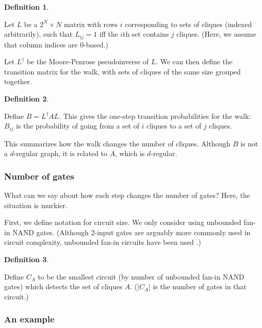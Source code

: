 \documentclass[12pt]{article}
\theoremstyle{definition}
\newtheorem{defn}{Definition}[section]
\begin{document}
\begin{defn} \label{defn:levels}

Let $L$ be a $2^N{\times}N$ matrix with rows $i$ corresponding to sets of cliques (indexed arbitrarily), such that
$L_{ij} = 1$ iff the $i$th set contains $j$ cliques. (Here, we assume that column indices are 0-based.)

\end{defn}

Let $L^{\dagger}$ be the Moore-Penrose pseudoinverse of $L$.
We can then define the transition matrix for the walk, with sets of cliques of the same size grouped together.

\begin{defn} \label{defn:B}

Define
$B = L^{\dagger}AL$. This gives the one-step transition probabilities for the walk: $B_{ij}$ is the
probability of going from a set of $i$ cliques to a set of $j$ cliques.

\end{defn}

This summarizes how the walk changes the number of cliques.
Although $B$ is not a $d$-regular graph, it is related to $A$, which is $d$-regular.

\subsubsection{Number of gates}

What can we say about how each step changes the number of gates? Here, the situation is murkier.

First, we define notation for circuit size. 
We only consider using unbounded fan-in NAND gates. (Although
2-input gates are arguably more commonly used in circuit complexity,
unbounded fan-in circuits have been used
\cite{wegener1991complexity}\cite{allender1994depth}.)

\begin{defn} \label{defn:circuitSize}

Define $C_A$ to be the smallest circuit (by number of unbounded fan-in NAND gates)
which detects the set of cliques $A$. ($|C_A|$ is the number of gates in that circuit.)

\end{defn}

\subsubsection{An example}
\end{document}
